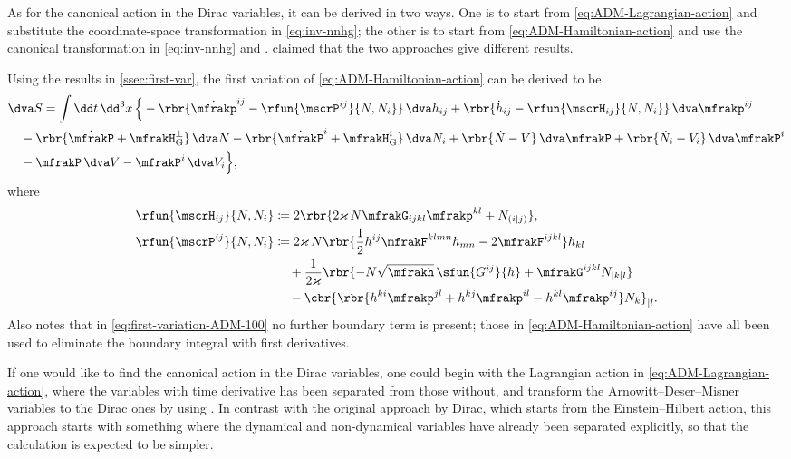 \documentclass[a4paper,11pt]{article}
\begin{document}
As for the canonical action in the Dirac variables, it can be derived in two 
ways. One is to start from \cref{eq:ADM-Lagrangian-action} and substitute the 
coordinate-space transformation in \cref{eq:inv-nnhg}; the other is to start 
from \cref{eq:ADM-Hamiltonian-action} and use the canonical transformation in
\cref{eq:inv-nnhg} and . 
\citeauthor{Kiriushcheva2008} claimed \cite{Kiriushcheva2008} that the two 
approaches give different results.

Using the results in \cref{ssec:first-var}, the first variation of 
\cref{eq:ADM-Hamiltonian-action} can be derived to be
\begin{align}
&
\dva S = \int\dd t\,\dd^3 x \,\Big\{ -
\rbr{\dot{\mfrakp}^{ij} - \rfun{\mscrP^{ij}}{N, N_i}}\,\dva h_{ij} +
\rbr{\dot{h}_{ij} - \rfun{\mscrH_{ij}}{N, N_i}}\,\dva \mfrakp^{ij}
\nonumber \\
&\quad-
\rbr{\dot{\mfrakP} + \mfrakH_\text{G}^\perp}\,\dva N -
\rbr{\dot{\mfrakP}^i + \mfrakH_\text{G}^i}\,\dva N_i +
\rbr{\dot{N} - V}\,\dva \mfrakP + 
\rbr{\dot{N}_i - V_i}\,\dva \mfrakP^i
\nonumber \\
&\quad-
\mfrakP\,\dva V - \mfrakP^i\,\dva V_i
\Big\},
\label{eq:first-variation-ADM-100}
\end{align}
where
\begin{align}
\rfun{\mscrH_{ij}}{N, N_i} &\coloneqq
2\rbr{2\varkappa\,N\mfrakG_{ijkl}\mfrakp^{kl} + N_{(i|j)}},
\label{eq:mscrHij-100} \\
\rfun{\mscrP^{ij}}{N, N_i} &\coloneqq
2 \varkappa\,N\rbr{\frac{1}{2}h^{ij} \mfrakF^{klmn} h_{mn}
- 2 \mfrakF^{ijkl}} h_{kl}
\nonumber \\
&\quad\,
+\frac{1}{2\varkappa}
\rbr{-N\sqrt{\mfrakh}\,\sfun{G^{ij}}{h}
+\mfrakG^{ijkl} N_{|k|l}}
\nonumber \\
&\quad\,
-\cbr{\rbr{h^{ki}\mfrakp^{jl}+h^{kj}\mfrakp^{il}-h^{kl}\mfrakp^{ij}}N_k}_{|l}.
\label{eq:mscrPij-100}
\end{align}
Also notes that in \cref{eq:first-variation-ADM-100} no further boundary term 
is present; those in \cref{eq:ADM-Hamiltonian-action} have all been used to 
eliminate the boundary integral with first derivatives.

If one would like to find the canonical action in the Dirac variables, one could 
begin with the Lagrangian action in \cref{eq:ADM-Lagrangian-action}, where the 
variables with time derivative has been separated from those without, and 
transform the Arnowitt--Deser--Misner variables to the Dirac ones by using 
. In contrast with the original approach by 
Dirac, which starts from the Einstein--Hilbert action, this approach starts with 
something where the dynamical and non-dynamical variables have already been 
separated explicitly, so that the calculation is expected to be simpler.
\end{document}
